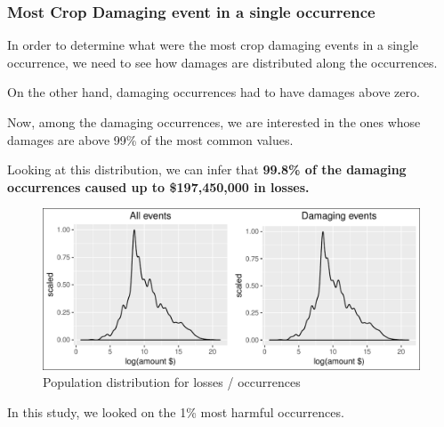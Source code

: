 \documentclass[]{article}
\begin{document}
\subsubsection{Most Crop Damaging event in a single
occurrence}\label{most-crop-damaging-event-in-a-single-occurrence}

In order to determine what were the most crop damaging events in a
single occurrence, we need to see how damages are distributed along the
occurrences.

On the other hand, damaging occurrences had to have damages above zero.

Now, among the damaging occurrences, we are interested in the ones whose
damages are above 99\% of the most common values.

Looking at this distribution, we can infer that \textbf{99.8\% of the
damaging occurrences caused up to \$197,450,000 in losses.}

\begin{figure}[htbp]
\centering
\includegraphics{readme_files/figure-latex/crop-distr-4-1.pdf}
\caption{Population distribution for losses / occurrences}
\end{figure}

In this study, we looked on the 1\% most harmful occurrences.
\end{document}
